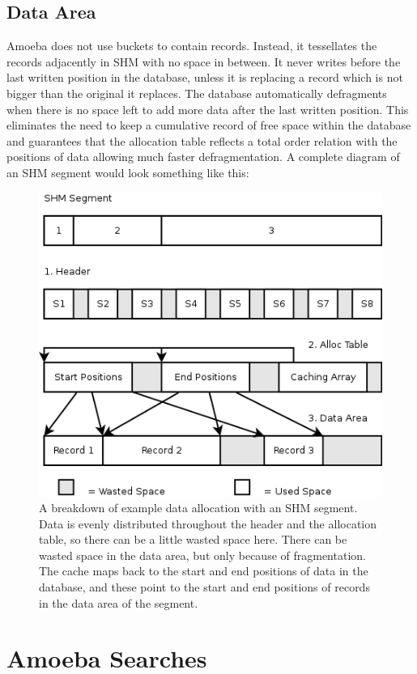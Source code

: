 \documentclass[11pt]{article}
\begin{document}
\subsection{Data Area}
Amoeba does not use buckets to contain records. Instead, it tessellates the records adjacently in SHM with no space in between. It never writes before the last written position in the database, unless it is replacing a record which is not bigger than the original it replaces. The database automatically defragments when there is no space left to add more data after the last written position. This eliminates the need to keep a cumulative record of free space within the database and guarantees that the allocation table reflects a total order relation with the positions of data allowing much faster defragmentation.
\newpage
\noindent
A complete diagram of an SHM segment would look something like this:
\begin{figure}[ht]
\centering
\includegraphics[scale=0.7]{SHMStructure1.png}
\caption{A breakdown of example data allocation with an SHM segment. Data is evenly distributed throughout the header and the allocation table, so there can be a little wasted space here. There can be wasted space in the data area, but only because of fragmentation. The cache maps back to the start and end positions of data in the database, and these point to the start and end positions of records in the data area of the segment.}
\end{figure}
\newpage
\noindent
\section{Amoeba Searches}
\end{document}
